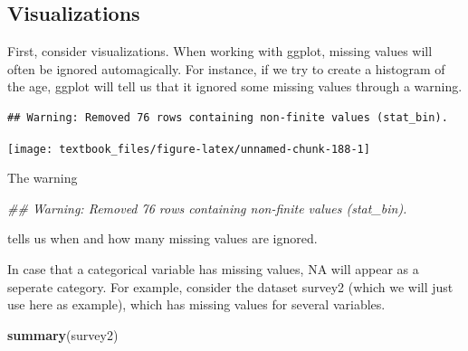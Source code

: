 \documentclass[]{tufte-book}
\newenvironment{Shaded}{}{}
\newcommand{\CommentTok}[1]{\textcolor[rgb]{0.38,0.63,0.69}{\textit{#1}}}
\newcommand{\DataTypeTok}[1]{\textcolor[rgb]{0.56,0.13,0.00}{#1}}
\newcommand{\DecValTok}[1]{\textcolor[rgb]{0.25,0.63,0.44}{#1}}
\newcommand{\KeywordTok}[1]{\textcolor[rgb]{0.00,0.44,0.13}{\textbf{#1}}}
\newcommand{\NormalTok}[1]{#1}
\newcommand{\OperatorTok}[1]{\textcolor[rgb]{0.40,0.40,0.40}{#1}}
\newcommand{\StringTok}[1]{\textcolor[rgb]{0.25,0.44,0.63}{#1}}
\begin{document}
\hypertarget{visualizations}{%
\subsection{Visualizations}\label{visualizations}}

First, consider visualizations. When working with ggplot, missing values will often be ignored automagically. For instance, if we try to create a histogram of the age, ggplot will tell us that it ignored some missing values through a warning.

\begin{Shaded}
\end{Shaded}

\begin{verbatim}
## Warning: Removed 76 rows containing non-finite values (stat_bin).
\end{verbatim}

\texttt{[image: textbook\_files/figure-latex/unnamed-chunk-188-1]}

The warning

\begin{Shaded}
\begin{Highlighting}[]
\CommentTok{## Warning: Removed 76 rows containing non-finite values (stat_bin).}
\end{Highlighting}
\end{Shaded}

tells us when and how many missing values are ignored.

In case that a categorical variable has missing values, NA will appear as a seperate category. For example, consider the dataset survey2 (which we will just use here as example), which has missing values for several variables.

\begin{Shaded}
\begin{Highlighting}[]
\KeywordTok{summary}\NormalTok{(survey2)}
\end{Highlighting}
\end{Shaded}
\end{document}
